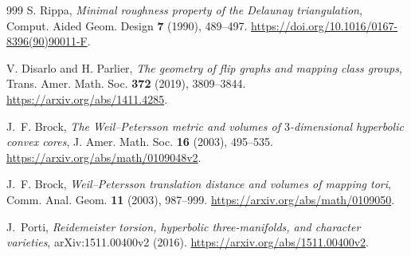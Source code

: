 \documentclass[11pt,a4paper]{article}
\numberwithin{equation}{section}
\theoremstyle{definition}
\theoremstyle{remark}
\begin{document}
\begin{thebibliography}{999}
S. Rippa,
\emph{Minimal roughness property of the Delaunay triangulation},
Comput. Aided Geom. Design \textbf{7} (1990), 489--497.
\url{https://doi.org/10.1016/0167-8396(90)90011-F}.

V. Disarlo and H. Parlier,
\emph{The geometry of flip graphs and mapping class groups},
Trans. Amer. Math. Soc. \textbf{372} (2019), 3809--3844.
\url{https://arxiv.org/abs/1411.4285}.

J.~F. Brock,
\emph{The Weil--Petersson metric and volumes of $3$-dimensional hyperbolic
convex cores},
J. Amer. Math. Soc. \textbf{16} (2003), 495--535.
\url{https://arxiv.org/abs/math/0109048v2}.

J.~F. Brock,
\emph{Weil--Petersson translation distance and volumes of mapping tori},
Comm. Anal. Geom. \textbf{11} (2003), 987--999.
\url{https://arxiv.org/abs/math/0109050}.

J.~Porti,
\emph{Reidemeister torsion, hyperbolic three-manifolds, and character varieties},
arXiv:1511.00400v2 (2016).
\url{https://arxiv.org/abs/1511.00400v2}.

\end{thebibliography}
\end{document}
